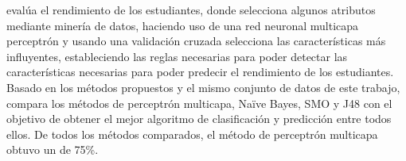 \textcite{borkar2014attributes} evalúa el rendimiento de los estudiantes, donde selecciona algunos atributos mediante minería de datos, haciendo uso de una red neuronal multicapa perceptrón y usando una validación cruzada selecciona las características más influyentes, estableciendo las reglas necesarias para poder detectar las características necesarias para poder predecir el rendimiento de los estudiantes. Basado en los métodos propuestos y el mismo conjunto de datos de este trabajo, \textcite{jayakameswaraiah2014study} compara los métodos de perceptrón multicapa, Na\"ive Bayes, SMO y J48 con el objetivo de obtener el mejor algoritmo de clasificación y predicción entre todos ellos. De todos los métodos comparados, el método de perceptrón multicapa obtuvo un  de 75\%.






